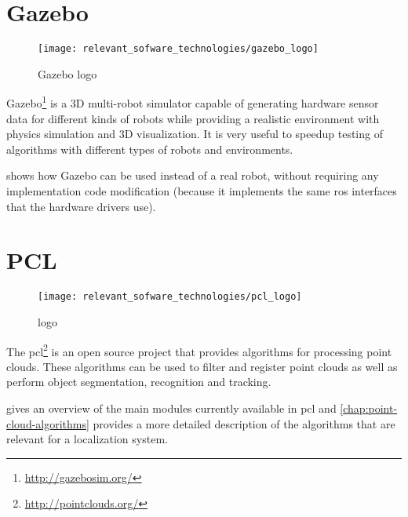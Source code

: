\section{Gazebo}

\begin{wrapfigure}{r}{0.25\textwidth}
	\centering
	\texttt{[image: relevant\_sofware\_technologies/gazebo\_logo]}
	\caption{Gazebo logo}
	\label{fig:relevant-sofware-technologies_gazebo-logo}
\end{wrapfigure}


Gazebo\footnote{\url{http://gazebosim.org/}} is a 3D multi-robot simulator capable of generating hardware sensor data for different kinds of robots while providing a realistic environment with physics simulation and 3D visualization. It is very useful to speedup testing of algorithms with different types of robots and environments.

 shows how Gazebo can be used instead of a real robot, without requiring any implementation code modification (because it implements the same \gls{ros} interfaces that the hardware drivers use).




\section{PCL}

\begin{wrapfigure}{r}{0.25\textwidth}
	\centering
	\texttt{[image: relevant\_sofware\_technologies/pcl\_logo]}
	\caption{ logo}
	\label{fig:relevant-sofware-technologies_pcl-logo}
\end{wrapfigure}

The \gls{pcl}\footnote{\url{http://pointclouds.org/}} \cite{Rusu2011} is an open source project that provides algorithms for processing point clouds. These algorithms can be used to filter and register point clouds as well as perform object segmentation, recognition and tracking.

 gives an overview of the main modules currently available in \gls{pcl} and \cref{chap:point-cloud-algorithms} provides a more detailed description of the algorithms that are relevant for a localization system.


